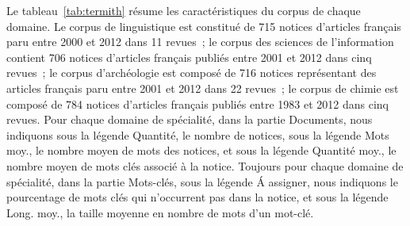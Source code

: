 \documentclass[10pt,twoside]{article}
\begin{document}
Le tableau~\ref{tab:termith} résume les caractéristiques du corpus de chaque domaine. Le corpus de linguistique est constitué de 715 notices d'articles
    français paru entre 2000 et 2012 dans 11 revues~; le corpus des sciences de
    l'information contient 706 notices d'articles français publiés entre 2001 et
    2012 dans cinq revues~; le corpus d'archéologie est composé de 716 notices
    représentant des articles français paru entre 2001 et 2012 dans 22 revues~;
    le corpus de chimie est composé de 784 notices d'articles français publiés
    entre 1983 et 2012 dans cinq revues. Pour chaque domaine de spécialité, dans la partie Documents, nous indiquons sous la légende Quantité, le nombre de notices, sous la légende Mots moy., le nombre moyen de mots des notices, et sous la légende Quantité moy., le nombre moyen de mots clés associé à la notice. Toujours pour chaque domaine de spécialité, dans la partie Mots-clés, sous la légende \'A assigner, nous indiquons le pourcentage de mots clés qui n'occurrent pas dans la notice, et sous la légende Long. moy., la taille moyenne en nombre de mots d'un mot-clé.
\end{document}
